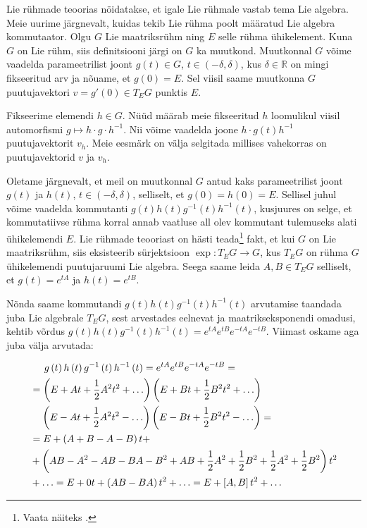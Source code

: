 \documentclass[12pt,a4paper,oneside]{article}
\theoremstyle{plain}
\theoremstyle{definition}
\numberwithin{equation}{section}
\def\R{{\mathbb R}}
\begin{document}
Lie rühmade teoorias nöidatakse, et igale Lie rühmale vastab tema 
Lie algebra. Meie uurime järgnevalt, kuidas tekib Lie rühma poolt 
määratud Lie algebra kommutaator. Olgu $G$ Lie maatriksrühm ning $E$ 
selle rühma ühikelement. Kuna $G$ on Lie rühm, siis definitsiooni 
järgi on $G$ ka muutkond. Muutkonnal $G$ võime vaadelda 
parameetrilist joont 
$g\left(t\right) \in G$, $t \in \left(-\delta, \delta\right)$, kus 
$\delta \in \R$ on mingi fikseeritud arv ja nõuame, et 
$g\left(0\right) = E$. Sel viisil saame muutkonna $G$ puutujavektori 
$v = g'\left(0\right) \in T_E G$ punktis $E$.

Fikseerime elemendi $h \in G$. Nüüd määrab meie fikseeritud $h$ 
loomulikul viisil automorfismi $g \mapsto h \cdot g \cdot h^{-1}$. 
Nii võime vaadelda joone $h \cdot g\left(t\right) h^{-1}$ 
puutujavektorit $v_h$. Meie eesmärk on välja selgitada millises 
vahekorras on puutujavektorid $v$ ja $v_h$.

Oletame järgnevalt, et meil on muutkonnal $G$ antud kaks 
parameetrilist joont $g\left(t\right)$ ja $h\left(t\right)$, 
$t \in \left(-\delta, \delta\right)$, selliselt, et 
$g\left(0\right) = h\left(0\right) = E$. Sellisel juhul võime 
vaadelda kommutanti $g\left(t\right) h\left(t\right) 
g^{-1}\left(t\right) h^{-1}\left(t\right)$, kusjuures on selge, et 
kommutatiivse rühma korral annab vaatluse all olev kommutant 
tulemuseks alati ühikelemendi $E$. Lie rühmade teooriast on hästi 
teada\footnote{Vaata näiteks \cite[Exponential map]{Kirillov}.} fakt, 
et kui $G$ on Lie maatriksrühm, siis eksisteerib sürjektsioon 
$\exp : T_E G \rightarrow G$, kus $T_E G$ on rühma $G$ ühikelemendi 
puutujaruumi Lie algebra. Seega saame leida $A, B \in T_E G$ 
selliselt, et $g\left(t\right) = e^{tA}$ ja $h\left(t\right) = 
e^{tB}$. 

Nõnda saame kommutandi 
$g\left(t\right) h\left(t\right) g^{-1}\left(t\right) 
h^{-1}\left(t\right)$ arvutamise taandada juba Lie algebrale 
$T_E G$, sest arvestades eelnevat ja maatrikseksponendi omadusi, 
kehtib võrdus $g\left(t\right) h\left(t\right) g^{-1}\left(t\right) 
h^{-1}\left(t\right) = e^{tA} e^{tB} e^{-tA} e^{-tB}$. 
Viimast oskame aga juba välja arvutada:

\begin{align*}
&\hphantom{=}\ \ g\left(t\right) h\left(t\right) g^{-1}\left(t\right) 
	h^{-1}\left(t\right) = e^{tA} e^{tB} e^{-tA} e^{-tB} = \\
&= \left(E + At + \frac{1}{2}A^2 t^2 + \ldots \right) 
	\left(E + Bt + \frac{1}{2}B^2 t^2 + \ldots \right) \\
&\hphantom{=}\ \left(E - At + \frac{1}{2}A^2 t^2 - \ldots \right) 
	\left(E - Bt + \frac{1}{2}B^2 t^2 - \ldots \right) = \\
&= E + \left(A + B - A - B\right)t + \\
	&+ \left(AB - A^2 - AB - BA - B^2 + AB + \frac{1}{2} A^2 + 
	\frac{1}{2} B^2 + \frac{1}{2} A^2 + \frac{1}{2} B^2\right)t^2 \\
	&+ \ldots = E + 0t + \left(AB - BA\right)t^2 + \ldots = E + 
	\left[A, B\right]t^2 + \ldots
\end{align*}
\end{document}
